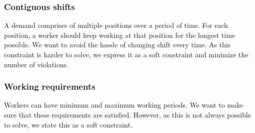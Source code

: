\documentclass[../thesis.tex]{subfiles}
\begin{document}
\subsubsection{Contiguous shifts}

A demand comprises of multiple positions over a period of time. 
For each position, a worker should keep working at that position for the longest time possible. 
We want to avoid the hassle of changing shift every time. 
As this constraint is harder to solve, we express it as a soft constraint and minimize the number of 
violations.

\subsubsection{Working requirements}

Workers can have minimum and maximum working periods. We want to make sure 
that these requirements are satisfied. However, as this is not always possible to solve, we 
state this as a soft constraint.
\end{document}
